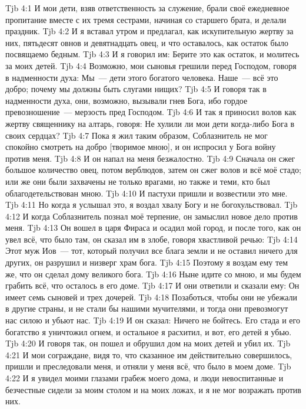 \vs Tjb 4:1
И мои дети, взяв ответственность за служение, брали своё ежедневное пропитание вместе с их тремя сестрами, начиная со старшего брата, и делали праздник.
\vs Tjb 4:2
И я вставал утром и предлагал, как искупительную жертву за них, пятьдесят овнов и девятнадцать овец, и что оставалось, как остаток было посвящаемо бедным.
\vs Tjb 4:3
И я говорил им: Берите это как остаток, и молитесь за моих детей.
\vs Tjb 4:4
Возможно, мои сыновья грешили перед Господом, говоря в надменности духа: Мы~--- дети этого богатого человека. Наше~--- всё это добро; почему мы должны быть слугами нищих?
\vs Tjb 4:5
И говоря так в надменности духа, они, возможно, вызывали гнев Бога, ибо гордое превозношение~--- мерзость пред Господом.
\vs Tjb 4:6
И так я приносил волов как жертву священнику на алтарь, говоря: Не хулили ли мои дети когда-либо Бога в своих сердцах?
\vs Tjb 4:7
Пока я жил таким образом, Соблазнитель не мог спокойно смотреть на добро [творимое мною], и он испросил у Бога войну против меня.
\vs Tjb 4:8
И он напал на меня безжалостно.
\vs Tjb 4:9
Сначала он сжег большое количество овец, потом верблюдов, затем он сжег волов и всё моё стадо; или же они были захвачены не только врагами, но также и теми, кто был облагодетельствован мною.
\vs Tjb 4:10
И пастухи пришли и возвестили это мне.
\vs Tjb 4:11
Но когда я услышал это, я воздал хвалу Богу и не богохульствовал.
\vs Tjb 4:12
И когда Соблазнитель познал моё терпение, он замыслил новое дело против меня.
\vs Tjb 4:13
Он вошел в царя Фираса и осадил мой город, и после того, как он увел всё, что было там, он сказал им в злобе, говоря хвастливой речью:
\vs Tjb 4:14
Этот муж Иов~--- тот, который получил все блага земли и не оставил ничего для других, он разрушил и низверг храм бога.
\vs Tjb 4:15
Поэтому я воздам ему тем же, что он сделал дому великого бога.
\vs Tjb 4:16
Ныне идите со мною, и мы будем грабить всё, что осталось в его доме.
\vs Tjb 4:17
И они ответили и сказали ему: Он имеет семь сыновей и трех дочерей.
\vs Tjb 4:18
Позаботься, чтобы они не убежали в другие страны, и не стали бы нашими мучителями, и тогда они превозмогут нас силою и убьют нас.
\vs Tjb 4:19
И он сказал: Ничего не бойтесь. Его стада и его богатство я уничтожил огнем, и остальное я расхитил, и вот, его детей я убью.
\vs Tjb 4:20
И говоря так, он пошел и обрушил дом на моих детей и убил их.
\vs Tjb 4:21
И мои сограждане, видя то, что сказанное им действительно совершилось, пришли и преследовали меня, и отняли у меня всё, что было в моем доме.
\vs Tjb 4:22
И я увидел моими глазами грабеж моего дома, и люди невоспитанные и безчестные сидели за моим столом и на моих ложах, и я не мог возражать против них.
